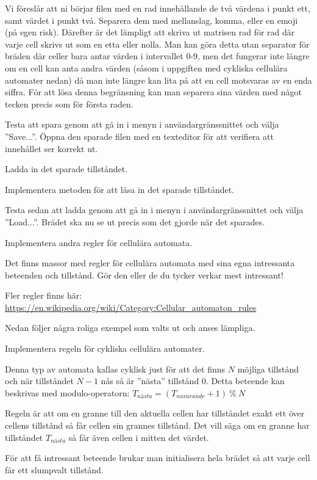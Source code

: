 Vi föreslår att ni börjar filen med en rad innehållande de två värdena i punkt ett, samt värdet i punkt två. Separera dem med mellanslag, komma, eller en emoji (på egen risk). Därefter är det lämpligt att skriva ut matrisen rad för rad där varje cell skrivs ut som en etta eller nolla. Man kan göra detta utan separator för bräden där celler bara antar värden i intervallet 0-9, men det fungerar inte längre om en cell kan anta andra värden (såsom i uppgiften med cykliska cellulära automater nedan) då man inte längre kan lita på att en cell motsvaras av en enda siffra. För att lösa denna begränsning kan man separera sina värden med något tecken precis som för första raden.

Testa att spara genom att gå in i menyn i användargränssnittet och välja ''Save...''. Öppna den sparade filen med en texteditor för att verifiera att innehållet ser korrekt ut.

\Subtask Ladda in det sparade tillståndet.

Implementera metoden  för att läsa in det sparade tillståndet.

Testa sedan att ladda genom att gå in i menyn i användargränssnittet och välja ''Load...''. Brädet ska nu se ut precis som det gjorde när det sparades.

\Task Implementera andra regler för cellulära automata.

Det finns massor med regler för cellulära automata med sina egna intressanta beteenden och tillstånd.
Gör den eller de du tycker verkar mest intressant!

Fler regler finns här: \url{https://en.wikipedia.org/wiki/Category:Cellular_automaton_rules}

Nedan följer några roliga exempel som valts ut och anses lämpliga.

\Subtask Implementera regeln för cykliska cellulära automater.

Denna typ av automata kallas cyklisk just för att det finns $N$ möjliga tillstånd och när tillståndet $N-1$ nås så är ''nästa'' tillstånd $0$.
Detta beteende kan beskrivas med modulo-operatorn: $T_{nästa} = (T_{nuvarande} + 1)\ \%\ N$

Regeln är att om en granne till den aktuella cellen har tillståndet exakt ett över cellens tillstånd så får cellen sin grannes tillstånd. Det vill säga om en granne har tillståndet $T_{nästa}$ så får även cellen i mitten det värdet.

För att få intressant beteende brukar man initialisera hela brädet så att varje cell får ett slumpvalt tillstånd.

